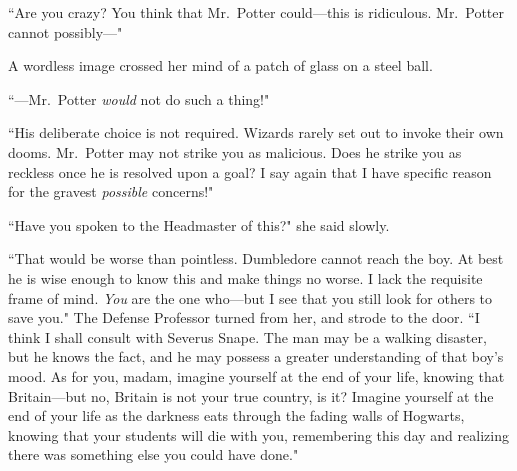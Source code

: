 ``Are you crazy? You think that Mr.~Potter could—this is ridiculous. Mr.~Potter cannot possibly—"

A wordless image crossed her mind of a patch of glass on a steel ball.

``—Mr.~Potter \emph{would} not do such a thing!"

``His deliberate choice is not required. Wizards rarely set out to invoke their own dooms. Mr.~Potter may not strike you as malicious. Does he strike you as reckless once he is resolved upon a goal? I say again that I have specific reason for the gravest \emph{possible} concerns!"

``Have you spoken to the Headmaster of this?" she said slowly.

``That would be worse than pointless. Dumbledore cannot reach the boy. At best he is wise enough to know this and make things no worse. I lack the requisite frame of mind. \emph{You} are the one who—but I see that you still look for others to save you." The Defense Professor turned from her, and strode to the door. ``I think I shall consult with Severus Snape. The man may be a walking disaster, but he knows the fact, and he may possess a greater understanding of that boy's mood. As for you, madam, imagine yourself at the end of your life, knowing that Britain—but no, Britain is not your true country, is it? Imagine yourself at the end of your life as the darkness eats through the fading walls of Hogwarts, knowing that your students will die with you, remembering this day and realizing there was something else you could have done."

